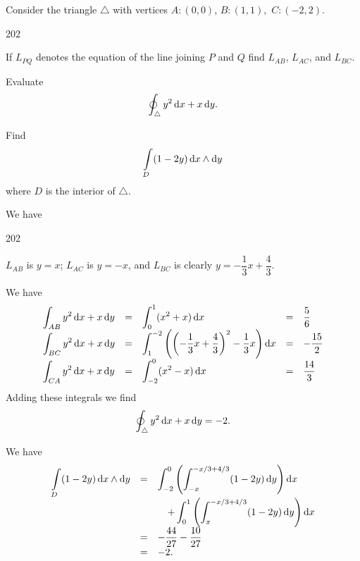 \begin{problem}
Consider the triangle $\triangle$ with vertices $A:(0,0)$, $B:(1,
1),$ $C:(-2, 2)$.
\begin{dingautolist}{202} \item If $L_{PQ}$ denotes the equation of the
line joining $P$ and $Q$ find $L_{AB}$,  $L_{AC}$, and $L_{BC}$.
 \item Evaluate
$$\doint _\triangle y^2\d{x}+ x\d{y}.$$

 \item  Find $$\dint\limits_{D} (1 - 2y) \d{x}\wedge \d{y}$$where ${D}$ is the interior of $\triangle$.
\end{dingautolist} \begin{answer}We have
\begin{dingautolist}{202} \item $L_{AB}$ is $y = x$;  $L_{AC}$  is
$y = -x$, and  $L_{BC}$ is clearly $y = -\dfrac{1}{3}x +
\dfrac{4}{3}$.
 \item  We have \renewcommand{\arraystretch}{1.5}
$${\everymath{\dis}\begin{array}{lllll}  \dint _{AB} y^2\d{x}+ x\d{y}  & = &  \dint _0 ^1 (x^2 + x)\d{x}            & = &  \dfrac{5}{6}  \\
\dint _{BC} y^2\d{x}+ x\d{y}  & = &  \dint _1 ^{-2}
\left(\left(-\dfrac{1}{3}x + \dfrac{4}{3}\right)^2 -\dfrac{1}{3}x \right)\d{x}            & = &  -\dfrac{15}{2}  \\
\dint _{CA} y^2\d{x}+ x\d{y}  & = &  \dint _{-2} ^0 (x^2 - x)\d{x}            & = &  \dfrac{14}{3}  \\
\end{array} }$$Adding these integrals we find $$ \doint _\triangle y^2\d{x}+ x\d{y} = -2.$$

 \item   We have
$${\everymath{\dis}\begin{array}{lll}\dint\limits_{D} (1 - 2y) \d{x}\wedge\d{y} & = & \dint _{-2} ^0 \left(\dint _{-x} ^{-x/3 + 4/3} (1 - 2y)
\d{y}\right) \d{x}\\ & &\quad + \dint _{0} ^1 \left(\dint _{x} ^{-x/3
+ 4/3}
(1 - 2y)\d{y}\right) \d{x} \\
& = & -\dfrac{44}{27} - \dfrac{10}{27} \\
& = & -2.
\end{array}}$$
\end{dingautolist}
\end{answer}
\end{problem}

